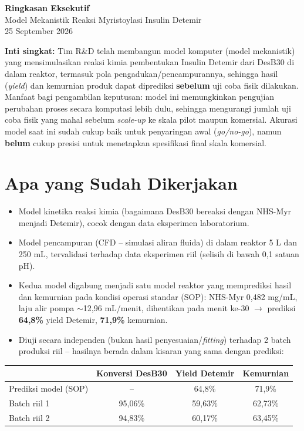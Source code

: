 \documentclass[11pt]{article}
\begin{document}
\begin{center}
{\LARGE\bfseries Ringkasan Eksekutif}\\[2pt]
{\large Model Mekanistik Reaksi Myristoylasi Insulin Detemir}\\[2pt]
\small 25 September 2026
\end{center}
\vspace{4pt}

\noindent\textbf{Inti singkat:} Tim R\&D telah membangun model komputer (model mekanistik)
yang mensimulasikan reaksi kimia pembentukan Insulin Detemir dari DesB30 di dalam reaktor,
termasuk pola pengadukan/pencampurannya, sehingga hasil (\emph{yield}) dan kemurnian produk
dapat diprediksi \textbf{sebelum} uji coba fisik dilakukan. Manfaat bagi pengambilan
keputusan: model ini memungkinkan pengujian perubahan proses secara komputasi lebih dulu,
sehingga mengurangi jumlah uji coba fisik yang mahal sebelum \emph{scale-up} ke skala pilot
maupun komersial. Akurasi model saat ini sudah cukup baik untuk penyaringan awal (\emph{go/no-go}),
namun \textbf{belum} cukup presisi untuk menetapkan spesifikasi final skala komersial.

\section{Apa yang Sudah Dikerjakan}
\begin{itemize}
  \item Model kinetika reaksi kimia (bagaimana DesB30 bereaksi dengan NHS-Myr menjadi
        Detemir), cocok dengan data eksperimen laboratorium.
  \item Model pencampuran (CFD -- simulasi aliran fluida) di dalam reaktor 5 L dan 250 mL,
        tervalidasi terhadap data eksperimen riil (selisih di bawah 0,1 satuan pH).
  \item Kedua model digabung menjadi satu model reaktor yang memprediksi hasil dan
        kemurnian pada kondisi operasi standar (SOP): NHS-Myr 0,482 mg/mL, laju alir pompa
        $\sim$12,96 mL/menit, dihentikan pada menit ke-30 $\rightarrow$ prediksi \textbf{64,8\%}
        yield Detemir, \textbf{71,9\%} kemurnian.
  \item Diuji secara independen (bukan hasil penyesuaian/\emph{fitting}) terhadap 2 batch
        produksi riil -- hasilnya berada dalam kisaran yang sama dengan prediksi:
\end{itemize}

\begin{center}
\small
\begin{tabular}{lccc}
\toprule
 & Konversi DesB30 & Yield Detemir & Kemurnian \\
\midrule
Prediksi model (SOP) & -- & 64,8\% & 71,9\% \\
Batch riil 1 & 95,06\% & 59,63\% & 62,73\% \\
Batch riil 2 & 94,83\% & 60,17\% & 63,45\% \\
\bottomrule
\end{tabular}
\end{center}
\end{document}
